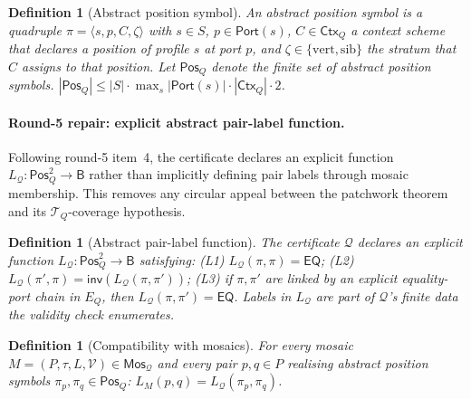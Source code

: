 \documentclass[11pt]{article}
\newtheorem{definition}[theorem]{Definition}
\newcommand{\Base}{\mathsf{B}}
\newcommand{\EQ}{\mathsf{EQ}}
\newcommand{\Inv}{\mathsf{inv}}
\newcommand{\Q}{\mathcal Q}
\newcommand{\Mos}{\mathsf{Mos}}
\newcommand{\Ctx}{\mathsf{Ctx}}
\newcommand{\Port}{\mathsf{Port}}
\newcommand{\vertical}{\mathrm{vert}}
\newcommand{\sibling}{\mathrm{sib}}
\newcommand{\Pos}{\mathsf{Pos}}
\newcommand{\T}{\mathcal T}
\begin{document}
\begin{definition}[Abstract position symbol]\label{def:abs-pos}
An abstract position symbol is a quadruple
$\pi=\langle s,p,C,\zeta\rangle$ with $s\in S$, $p\in\Port(s)$,
$C\in\Ctx_Q$ a context scheme that declares a position of profile
$s$ at port $p$, and $\zeta\in\{\vertical,\sibling\}$ the stratum
that $C$ assigns to that position.  Let $\Pos_Q$ denote the finite
set of abstract position symbols.  $|\Pos_Q|\le|S|\cdot
\max_s|\Port(s)|\cdot|\Ctx_Q|\cdot 2$.
\end{definition}

\paragraph{Round-5 repair: explicit abstract pair-label function.}
Following round-5 item~4, the certificate declares an explicit
function $L_\Q:\Pos_Q^2\to\Base$ rather than implicitly defining
pair labels through mosaic membership.  This removes any circular
appeal between the patchwork theorem and its $\T_Q$-coverage
hypothesis.

\begin{definition}[Abstract pair-label function]\label{def:Lq}
The certificate $\Q$ declares an explicit function
$L_\Q:\Pos_Q^2\to\Base$ satisfying: (L1) $L_\Q(\pi,\pi)=\EQ$; (L2)
$L_\Q(\pi',\pi)=\Inv(L_\Q(\pi,\pi'))$; (L3) if $\pi,\pi'$ are linked
by an explicit equality-port chain in $E_Q$, then
$L_\Q(\pi,\pi')=\EQ$.  Labels in $L_\Q$ are part of $\Q$'s finite
data the validity check enumerates.
\end{definition}

\begin{definition}[Compatibility with mosaics]\label{def:LM-Lq}
For every mosaic $M=(P,\tau,L,\mathcal V)\in\Mos_\Q$ and every pair
$p,q\in P$ realising abstract position symbols $\pi_p,\pi_q\in
\Pos_Q$:  $L_M(p,q)=L_\Q(\pi_p,\pi_q)$.
\end{definition}
\end{document}
